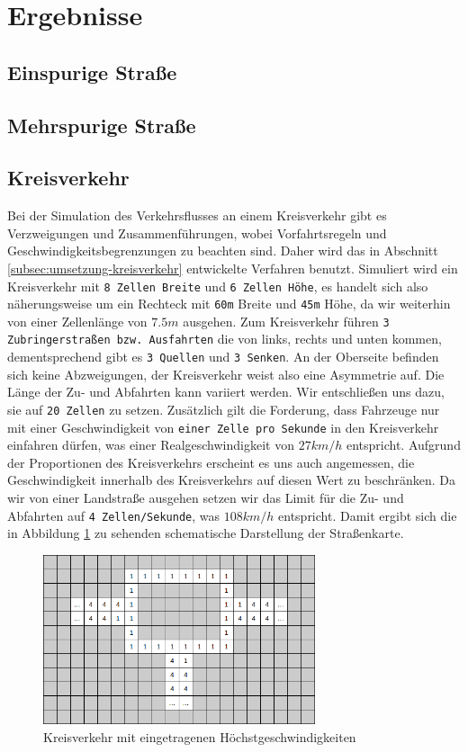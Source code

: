 \documentclass[11pt, a4paper]{article}
\begin{document}
\newpage
\section{Ergebnisse}
\label{sec:ergebnisse}
\subsection{Einspurige Straße}
\subsection{Mehrspurige Straße}
\subsection{Kreisverkehr}
Bei der Simulation des Verkehrsflusses an einem Kreisverkehr gibt es Verzweigungen und Zusammenführungen, wobei Vorfahrtsregeln und Geschwindigkeitsbegrenzungen zu beachten sind. Daher wird das in Abschnitt \ref{subsec:umsetzung-kreisverkehr} entwickelte Verfahren benutzt. Simuliert wird ein Kreisverkehr mit \texttt{8 Zellen Breite} und \texttt{6 Zellen Höhe}, es handelt sich also näherungsweise um ein Rechteck mit \texttt{60m} Breite und \texttt{45m} Höhe, da wir weiterhin von einer Zellenlänge von $7.5m$ ausgehen. Zum Kreisverkehr führen \texttt{3 Zubringerstraßen bzw. Ausfahrten} die von links, rechts und unten kommen, dementsprechend gibt es \texttt{3 Quellen} und \texttt{3 Senken}. An der Oberseite befinden sich keine Abzweigungen, der Kreisverkehr weist also eine Asymmetrie auf. Die Länge der Zu- und Abfahrten kann variiert werden. Wir entschließen uns dazu, sie auf \texttt{20 Zellen} zu setzen. Zusätzlich gilt die Forderung, dass Fahrzeuge nur mit einer Geschwindigkeit von \texttt{einer Zelle pro Sekunde} in den Kreisverkehr einfahren dürfen, was einer Realgeschwindigkeit von $27km/h$ entspricht. Aufgrund der Proportionen des Kreisverkehrs erscheint es uns auch angemessen, die Geschwindigkeit innerhalb des Kreisverkehrs auf diesen Wert zu beschränken. Da wir von einer Landstraße ausgehen setzen wir das Limit für die Zu- und Abfahrten auf \texttt{4 Zellen/Sekunde}, was $108km/h$ entspricht. Damit ergibt sich die in Abbildung \ref{fig:roundaboutSmall} zu sehenden schematische Darstellung der Straßenkarte.

\begin{figure}[h!]
	\centering
	\includegraphics[width=8cm]{img/roundaboutSmall}
	\caption{Kreisverkehr mit eingetragenen Höchstgeschwindigkeiten}
	\label{fig:roundaboutSmall}
\end{figure}
\end{document}
